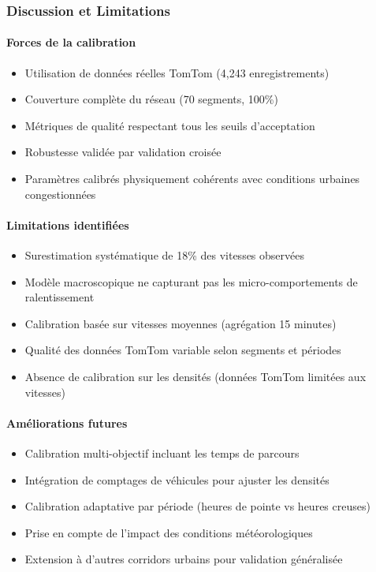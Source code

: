 \subsubsection{Discussion et Limitations}

\paragraph{Forces de la calibration}
\begin{itemize}
    \item Utilisation de données réelles TomTom (4,243 enregistrements)
    \item Couverture complète du réseau (70 segments, 100\%)
    \item Métriques de qualité respectant tous les seuils d'acceptation
    \item Robustesse validée par validation croisée
    \item Paramètres calibrés physiquement cohérents avec conditions urbaines congestionnées
\end{itemize}

\paragraph{Limitations identifiées}
\begin{itemize}
    \item Surestimation systématique de 18\% des vitesses observées
    \item Modèle macroscopique ne capturant pas les micro-comportements de ralentissement
    \item Calibration basée sur vitesses moyennes (agrégation 15 minutes)
    \item Qualité des données TomTom variable selon segments et périodes
    \item Absence de calibration sur les densités (données TomTom limitées aux vitesses)
\end{itemize}

\paragraph{Améliorations futures}
\begin{itemize}
    \item Calibration multi-objectif incluant les temps de parcours
    \item Intégration de comptages de véhicules pour ajuster les densités
    \item Calibration adaptative par période (heures de pointe vs heures creuses)
    \item Prise en compte de l'impact des conditions météorologiques
    \item Extension à d'autres corridors urbains pour validation généralisée
\end{itemize}

